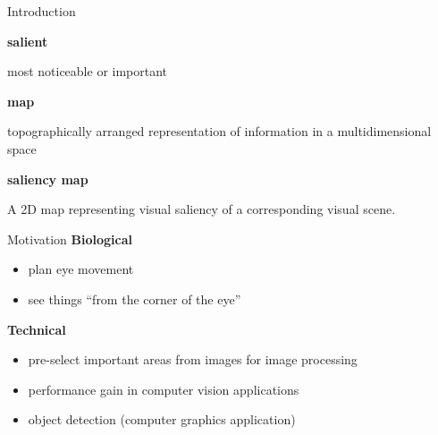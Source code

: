 \documentclass[compress,t]{beamer}
\begin{document}
\begin{frame}{Introduction}
    \begin{definition}
        \textbf{salient}

        most noticeable or important
    \end{definition}

    \pause

    \begin{definition}
        \textbf{map}
        
        topographically arranged representation of information in a
        multidimensional space
    \end{definition}

    \pause

    \begin{definition}
        \textbf{saliency map}

        A 2D map representing visual saliency of a corresponding visual scene.
    \end{definition}
\end{frame}

\begin{frame}{Motivation}
    \textbf{Biological}
    \begin{itemize}
        \item plan eye movement
        \item see things ``from the corner of the eye''
    \end{itemize}

    \textbf{Technical}
    \begin{itemize}
        \item pre-select important areas from images for image processing
        \item performance gain in computer vision applications
        \item object detection (computer graphics application)
    \end{itemize}
\end{frame}
\end{document}
